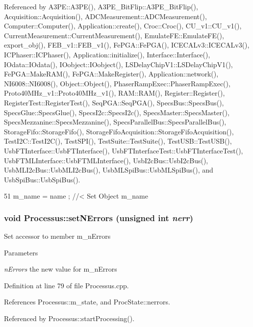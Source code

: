 Referenced by A3PE::A3PE(), A3PE\_\-BitFlip::A3PE\_\-BitFlip(), Acquisition::Acquisition(), ADCMeasurement::ADCMeasurement(), Computer::Computer(), Application::create(), Croc::Croc(), CU\_\-v1::CU\_\-v1(), CurrentMeasurement::CurrentMeasurement(), EmulateFE::EmulateFE(), export\_\-obj(), FEB\_\-v1::FEB\_\-v1(), FePGA::FePGA(), ICECALv3::ICECALv3(), ICPhaser::ICPhaser(), Application::initialize(), Interface::Interface(), IOdata::IOdata(), IOobject::IOobject(), LSDelayChipV1::LSDelayChipV1(), FePGA::MakeRAM(), FePGA::MakeRegister(), Application::network(), NI6008::NI6008(), Object::Object(), PhaserRampExec::PhaserRampExec(), Proto40MHz\_\-v1::Proto40MHz\_\-v1(), RAM::RAM(), Register::Register(), RegisterTest::RegisterTest(), SeqPGA::SeqPGA(), SpecsBus::SpecsBus(), SpecsGlue::SpecsGlue(), SpecsI2c::SpecsI2c(), SpecsMaster::SpecsMaster(), SpecsMezzanine::SpecsMezzanine(), SpecsParallelBus::SpecsParallelBus(), StorageFifo::StorageFifo(), StorageFifoAcquisition::StorageFifoAcquisition(), TestI2C::TestI2C(), TestSPI(), TestSuite::TestSuite(), TestUSB::TestUSB(), UsbFTInterface::UsbFTInterface(), UsbFTInterfaceTest::UsbFTInterfaceTest(), UsbFTMLInterface::UsbFTMLInterface(), UsbI2cBus::UsbI2cBus(), UsbMLI2cBus::UsbMLI2cBus(), UsbMLSpiBus::UsbMLSpiBus(), and UsbSpiBus::UsbSpiBus().


\begin{DoxyCode}
51 { m_name  = name  ; } //< Set Object m_name
\end{DoxyCode}
\hypertarget{classProcessus_a831b027b9cf18ab56fa6147b5d3055da}{
\subsubsection[{setNErrors}]{\setlength{\rightskip}{0pt plus 5cm}void Processus::setNErrors (unsigned int {\em nerr})}}
\label{classProcessus_a831b027b9cf18ab56fa6147b5d3055da}
Set accessor to member m\_\-nErrors 
\begin{DoxyParams}{Parameters}
\item[{\em nErrors}]the new value for m\_\-nErrors \end{DoxyParams}


Definition at line 79 of file Processus.cpp.

References Processus::m\_\-state, and ProcState::nerrors.

Referenced by Processus::startProcessing().


